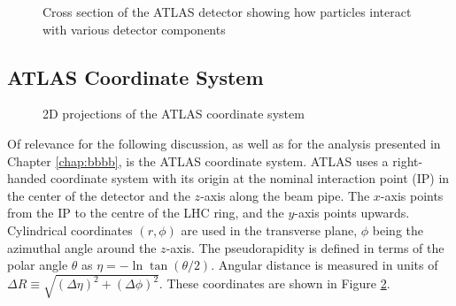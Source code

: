 \begin{figure}[ht]
\centering
{}
\caption{Cross section of the ATLAS detector showing how particles interact with various detector components \cite{ShowerImage} \label{fig:ATLAS-shower}}
\end{figure}

\subsection{ATLAS Coordinate System} 
\begin{figure}[ht]
\centering
{}
\caption{2D projections of the ATLAS coordinate system\label{fig:ATLAS-coords}}
\end{figure}

Of relevance for the following discussion, as well as for the analysis presented in Chapter \ref{chap:bbbb},
is the ATLAS coordinate system. ATLAS uses a right-handed coordinate system with its origin at the nominal 
interaction point (IP) in the center of the detector and the \(z\)-axis along the beam pipe.
The \(x\)-axis points from the IP to the centre of the LHC ring, and the \(y\)-axis points upwards.
Cylindrical coordinates \((r,\phi)\) are used in the transverse plane, \(\phi\) being the azimuthal angle 
around the \(z\)-axis. The pseudorapidity is defined in terms of the polar angle \(\theta\) as 
\(\eta = -\ln \tan(\theta/2)\). Angular distance is measured in units of 
\(\Delta R \equiv \sqrt{(\Delta\eta)^{2} + (\Delta\phi)^{2}}\). These coordinates are shown in Figure 
\ref{fig:ATLAS-coords}.

